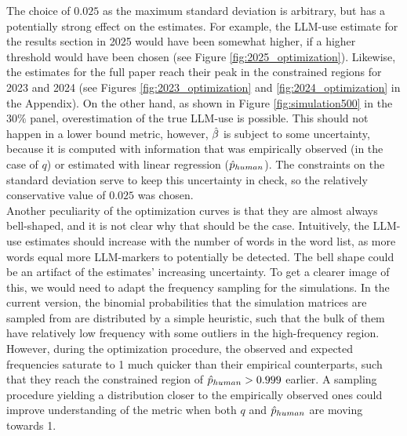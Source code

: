 The choice of $0.025$ as the maximum standard deviation is arbitrary, but has a potentially strong effect on the estimates.
For example, the LLM-use estimate for the results section in 2025 would have been somewhat higher, if a higher threshold would have been chosen (see Figure \ref{fig:2025_optimization}).
Likewise, the estimates for the full paper reach their peak in the constrained regions for 2023 and 2024 (see Figures \ref{fig:2023_optimization} and \ref{fig:2024_optimization} in the Appendix).
On the other hand, as shown in Figure \ref{fig:simulation500} in the $30\%$ panel, overestimation of the true LLM-use is possible.
This should not happen in a lower bound metric, however, $\hat{\beta}$ is subject to some uncertainty, because it is computed with information that was empirically observed (in the case of $q$) or estimated with linear regression ($\hat{p}_{human}$).
The constraints on the standard deviation serve to keep this uncertainty in check, so the relatively conservative value of $0.025$ was chosen.
\\
Another peculiarity of the optimization curves is that they are almost always bell-shaped, and it is not clear why that should be the case.
Intuitively, the LLM-use estimates should increase with the number of words in the word list, as more words equal more LLM-markers to potentially be detected.
The bell shape could be an artifact of the estimates' increasing uncertainty.
To get a clearer image of this, we would need to adapt the frequency sampling for the simulations.
In the current version, the binomial probabilities that the simulation matrices are sampled from are distributed by a simple heuristic, such that the bulk of them have relatively low frequency with some outliers in the high-frequency region.
However, during the optimization procedure, the observed and expected frequencies saturate to 1 much quicker than their empirical counterparts, such that they reach the constrained region of $\hat{p}_{human} > 0.999$ earlier.
A sampling procedure yielding a distribution closer to the empirically observed ones could improve understanding of the metric when both $q$ and $\hat{p}_{human}$ are moving towards 1.

